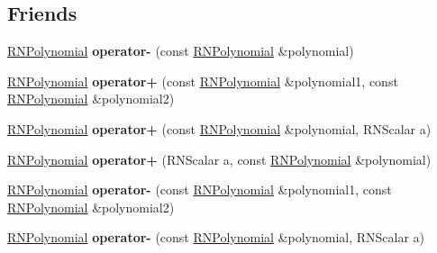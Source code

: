 \subsection*{Friends}
\begin{DoxyCompactItemize}
\item 
\hyperlink{class_r_n_polynomial}{R\+N\+Polynomial} {\bfseries operator-\/} (const \hyperlink{class_r_n_polynomial}{R\+N\+Polynomial} \&polynomial)\hypertarget{class_r_n_polynomial_a2afb69fbab20244104fff90a560e56e8}{}\label{class_r_n_polynomial_a2afb69fbab20244104fff90a560e56e8}

\item 
\hyperlink{class_r_n_polynomial}{R\+N\+Polynomial} {\bfseries operator+} (const \hyperlink{class_r_n_polynomial}{R\+N\+Polynomial} \&polynomial1, const \hyperlink{class_r_n_polynomial}{R\+N\+Polynomial} \&polynomial2)\hypertarget{class_r_n_polynomial_a6cb79f61765de8efafded355a4771150}{}\label{class_r_n_polynomial_a6cb79f61765de8efafded355a4771150}

\item 
\hyperlink{class_r_n_polynomial}{R\+N\+Polynomial} {\bfseries operator+} (const \hyperlink{class_r_n_polynomial}{R\+N\+Polynomial} \&polynomial, R\+N\+Scalar a)\hypertarget{class_r_n_polynomial_af405275fd8d6cc15f508dc618d2aef3a}{}\label{class_r_n_polynomial_af405275fd8d6cc15f508dc618d2aef3a}

\item 
\hyperlink{class_r_n_polynomial}{R\+N\+Polynomial} {\bfseries operator+} (R\+N\+Scalar a, const \hyperlink{class_r_n_polynomial}{R\+N\+Polynomial} \&polynomial)\hypertarget{class_r_n_polynomial_ab8f727f4ab079eb2edaac87c3734864c}{}\label{class_r_n_polynomial_ab8f727f4ab079eb2edaac87c3734864c}

\item 
\hyperlink{class_r_n_polynomial}{R\+N\+Polynomial} {\bfseries operator-\/} (const \hyperlink{class_r_n_polynomial}{R\+N\+Polynomial} \&polynomial1, const \hyperlink{class_r_n_polynomial}{R\+N\+Polynomial} \&polynomial2)\hypertarget{class_r_n_polynomial_a9c49458888910072679893b5bedcdc90}{}\label{class_r_n_polynomial_a9c49458888910072679893b5bedcdc90}

\item 
\hyperlink{class_r_n_polynomial}{R\+N\+Polynomial} {\bfseries operator-\/} (const \hyperlink{class_r_n_polynomial}{R\+N\+Polynomial} \&polynomial, R\+N\+Scalar a)\hypertarget{class_r_n_polynomial_a81c63501ca0365522c3df18506adbadb}{}\label{class_r_n_polynomial_a81c63501ca0365522c3df18506adbadb}


\end{DoxyCompactItemize}
